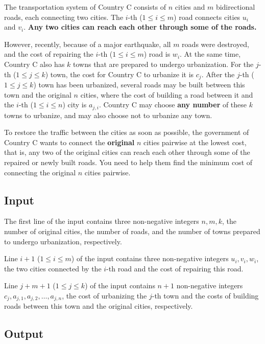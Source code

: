 \documentclass[11pt]{article}
\begin{document}
The transportation system of Country C consists of $n$ cities and $m$
bidirectional roads, each connecting two cities.
The $i$-th ($1 \le i \le m$) road connects cities $u_i$ and $v_i$.
\textbf{Any two cities can reach each other through some of the roads.}

However, recently, because of a major earthquake, all $m$ roads were
destroyed, and the cost of repairing the $i$-th ($1 \le i \le m$) road is
$w_i$.
At the same time, Country C also has $k$ towns that are prepared to undergo
urbanization.
For the $j$-th ($1 \le j \le k$) town, the cost for Country C to urbanize it
is $c_j$.
After the $j$-th ($1 \le j \le k$) town has been urbanized, several roads may
be built between this town and the original $n$ cities, where the cost of
building a road between it and the $i$-th ($1 \le i \le n$) city is
$a_{j,i}$.
Country C may choose \textbf{any number} of these $k$ towns to urbanize, and
may also choose not to urbanize any town.

To restore the traffic between the cities as soon as possible, the
government of Country C wants to connect the \textbf{original} $n$ cities
pairwise at the lowest cost, that is, any two of the original cities can
reach each other through some of the repaired or newly built roads.
You need to help them find the minimum cost of connecting the original $n$
cities pairwise.

\subsection*{Input}

The first line of the input contains three non-negative integers $n, m, k$,
the number of original cities, the number of roads, and the number of towns
prepared to undergo urbanization, respectively.

Line $i+1$ ($1 \le i \le m$) of the input contains three non-negative
integers $u_i, v_i, w_i$, the two cities connected by the $i$-th road and
the cost of repairing this road.

Line $j+m+1$ ($1 \le j \le k$) of the input contains $n+1$ non-negative
integers $c_j, a_{j,1}, a_{j,2}, \dots, a_{j,n}$, the cost of urbanizing
the $j$-th town and the costs of building roads between this town and the
original cities, respectively.

\subsection*{Output}
\end{document}
